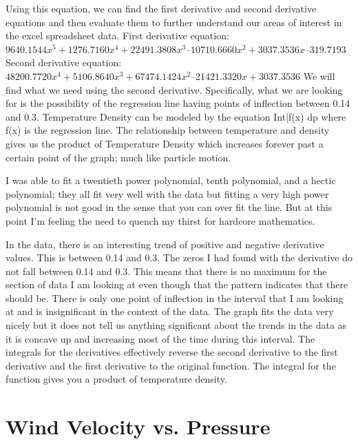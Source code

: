 \documentclass{article}
\begin{document}
Using this equation, we can find the first derivative and second derivative equations and then evaluate them to further understand our areas of interest in the excel spreadsheet data.
First derivative equation: $9640.1544x^5 + 1276.7160x^4 + 22491.3808x^3 – 10710.6660x^2 + 3037.3536x – 319.7193$
Second derivative equation: $48200.7720x^4 + 5106.8640x^3 + 67474.1424x^2 – 21421.3320x + 3037.3536$
We will find what we need using the second derivative. Specifically, what we are looking for is the possibility of the regression line having points of inflection between 0.14 and 0.3.
Temperature Density can be modeled by the equation Int|f(x) dp where f(x) is the regression line. The relationship between temperature and density gives us the product of Temperature Density which increases forever past a certain point of the graph; much like particle motion.

I was able to fit a twentieth power polynomial, tenth polynomial, and a hectic polynomial; they all fit very well with the data but fitting a very high power polynomial is not good in the sense that you can over fit the line. But at this point I’m feeling the need to quench my thirst for hardcore mathematics.

In the data, there is an interesting trend of positive and negative derivative values. This is between 0.14 and 0.3. The zeros I had found with the derivative do not fall between 0.14 and 0.3. This means that there is no maximum for the section of data I am looking at even though that the pattern indicates that there should be. There is only one point of inflection in the interval that I am looking at and is insignificant in the context of the data.
The graph fits the data very nicely but it does not tell us anything significant about the trends in the data as it is concave up and increasing most of the time during this interval.
The integrals for the derivatives effectively reverse the second derivative to the first derivative and the first derivative to the original function. The integral for the function gives you a product of temperature density.






\part{Wind Velocity vs. Pressure}
\label{george}
\end{document}
